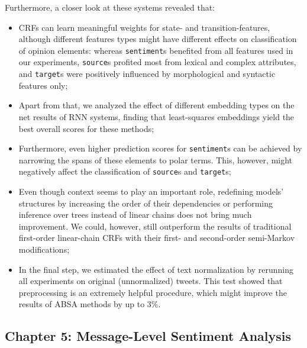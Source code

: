 \documentclass[11pt]{article}
\newcommand{\markable}[1]{\texttt{#1}}
\begin{document}
Furthermore, a closer look at these systems revealed that:
\begin{itemize}
\item CRFs can learn meaningful weights for state- and
  transition-features, although different features types might have
  different effects on classification of opinion elements: whereas
  \markable{sentiment}s benefited from all features used in our
  experiments, \markable{source}s profited most from lexical and
  complex attributes, and \markable{target}s were positively
  influenced by morphological and syntactic features only;
\item Apart from that, we analyzed the effect of different embedding
  types on the net results of RNN systems, finding that least-squares
  embeddings yield the best overall scores for these methods;
\item Furthermore, even higher prediction scores for
  \markable{sentiment}s can be achieved by narrowing the spans of
  these elements to polar terms.  This, however, might negatively
  affect the classification of \markable{source}s and
  \markable{target}s;
\item Even though context seems to play an important role, redefining
  models' structures by increasing the order of their dependencies or
  performing inference over trees instead of linear chains does not
  bring much improvement.  We could, however, still outperform the
  results of traditional first-order linear-chain CRFs with their
  first- and second-order semi-Markov modifications;
\item In the final step, we estimated the effect of text normalization
  by rerunning all experiments on original (unnormalized) tweets.
  This test showed that preprocessing is an extremely helpful
  procedure, which might improve the results of ABSA methods by up to
  3\%.
\end{itemize}

\subsection{Chapter 5: Message-Level Sentiment Analysis}
\end{document}
